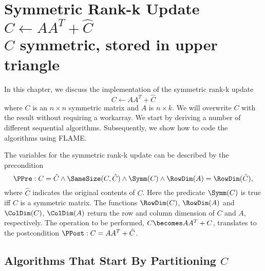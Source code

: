 %
%


\chapter{Symmetric Rank-k Update \\
$ C \leftarrow A A^T + \hat{C} $ \\
$ C $ symmetric, stored in upper triangle
}
\label{chapter:usyrk_unn}





In this chapter, we discuss the implementation of the symmetric rank-k update
\[
C \leftarrow A A^T + \hat{C}
\]
where $ C $ is an $ n \times n $ symmetric matrix and $ A $ is
$ n \times k $.  We will overwrite $ C $ with the result without
requiring a workarray.  We start by deriving a number of different
sequential algorithms.  Subsequently, we show how to code the
algorithms using FLAME.  

The variables for the symmetric rank-k update can be
described by the precondition
\[
\PPre:
C = \hat{C} \wedge \SameSize( C, \hat{C} ) \wedge \Symm( C ) \wedge
\RowDim( A )=\RowDim(\hat{C}),
\]
where $ \hat{C} $ indicates the original contents of $ C $.  Here the
predicate $ \Symm( C ) $ is true iff $ C $ is a symmetric
matrix.  The functions $ \RowDim( C ) $, $ \RowDim( A ) $  and $ \ColDim( C ) $,
$ \ColDim( A ) $ return
the row and column dimension of $ C $ and $ A $, respectively.  The operation to
be performed, $ C \becomes A A^T + C $, translates to the postcondition $
\PPost: C = A A^T + \hat{C} $.

\section{Algorithms That Start By Partitioning $ C $}
\label{sec:trmm_lln:L}

